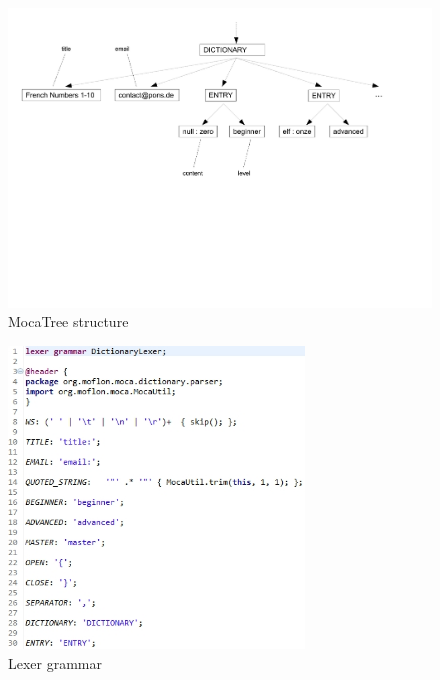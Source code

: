\begin{figure}[htp]
\begin{center}
 \includegraphics[width=\textwidth]{pics/moca/2TextToMocaTree/5-tree}
  \caption{MocaTree structure}
  \label{moca-5-Tree}
\end{center}
\end{figure}

\begin{figure}[htp]
\begin{center}
 \includegraphics[width=0.7\textwidth]{pics/moca/2TextToMocaTree/6-lexer}
  \caption{Lexer grammar}
  \label{moca-6-lexer}
\end{center}
\end{figure}

